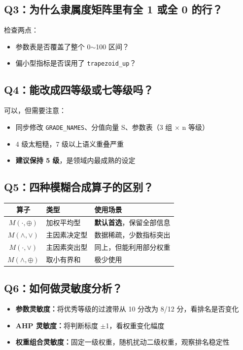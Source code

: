 \documentclass[a4paper,11pt]{ctexart}
\begin{document}
\subsection{Q3：为什么隶属度矩阵里有全 1 或全 0 的行？}

检查两点：
\begin{itemize}
    \item 参数表是否覆盖了整个 0$\sim$100 区间？
    \item 偏小型指标是否误用了 \texttt{trapezoid\_up}？
\end{itemize}

\subsection{Q4：能改成四等级或七等级吗？}

可以，但需要注意：
\begin{itemize}
    \item 同步修改 \texttt{GRADE\_NAMES}、分值向量 S、参数表（3 组 $\times$ n 等级）
    \item 4 级太粗糙，7 级以上语义重叠严重
    \item \textbf{建议保持 5 级}，是领域内最成熟的设定
\end{itemize}

\subsection{Q5：四种模糊合成算子的区别？}

\begin{table}[H]
\centering
\begin{tabular}{cll}
\toprule
\textbf{算子} & \textbf{类型} & \textbf{使用场景} \\
\midrule
$M(\cdot,\oplus)$ & 加权平均型 & \textbf{默认首选}，保留全部信息 \\
$M(\wedge,\vee)$ & 主因素决定型 & 数据稀疏，少数指标突出 \\
$M(\cdot,\vee)$ & 主因素突出型 & 同上，但能利用部分权重 \\
$M(\wedge,\oplus)$ & 取小有界和 & 极少使用 \\
\bottomrule
\end{tabular}
\end{table}

\subsection{Q6：如何做灵敏度分析？}

\begin{itemize}
    \item \textbf{参数灵敏度：}将优秀等级的过渡带从 10 分改为 8/12 分，看排名是否变化
    \item \textbf{AHP 灵敏度：}将判断标度 $\pm$1，看权重变化幅度
    \item \textbf{权重组合灵敏度：}固定一级权重，随机扰动二级权重，观察排名稳定性
\end{itemize}
\end{document}
